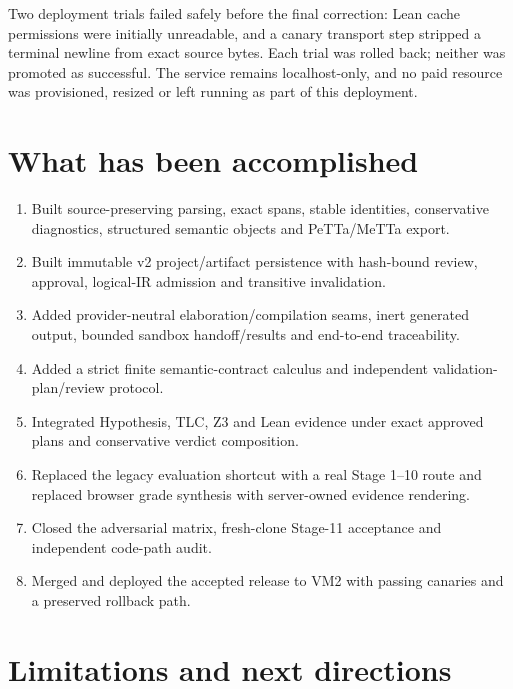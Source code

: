\documentclass[11pt]{article}
\begin{document}
Two deployment trials failed safely before the final correction: Lean cache
permissions were initially unreadable, and a canary transport step stripped a
terminal newline from exact source bytes.  Each trial was rolled back; neither
was promoted as successful.  The service remains localhost-only, and no paid
resource was provisioned, resized or left running as part of this deployment.

\section{What has been accomplished}

\begin{enumerate}
\item Built source-preserving parsing, exact spans, stable identities,
conservative diagnostics, structured semantic objects and PeTTa/MeTTa export.
\item Built immutable v2 project/artifact persistence with hash-bound review,
approval, logical-IR admission and transitive invalidation.
\item Added provider-neutral elaboration/compilation seams, inert generated
output, bounded sandbox handoff/results and end-to-end traceability.
\item Added a strict finite semantic-contract calculus and independent
validation-plan/review protocol.
\item Integrated Hypothesis, TLC, Z3 and Lean evidence under exact approved
plans and conservative verdict composition.
\item Replaced the legacy evaluation shortcut with a real Stage 1--10 route
and replaced browser grade synthesis with server-owned evidence rendering.
\item Closed the adversarial matrix, fresh-clone Stage-11 acceptance and
independent code-path audit.
\item Merged and deployed the accepted release to VM2 with passing canaries and
a preserved rollback path.
\end{enumerate}

\section{Limitations and next directions}
\end{document}
